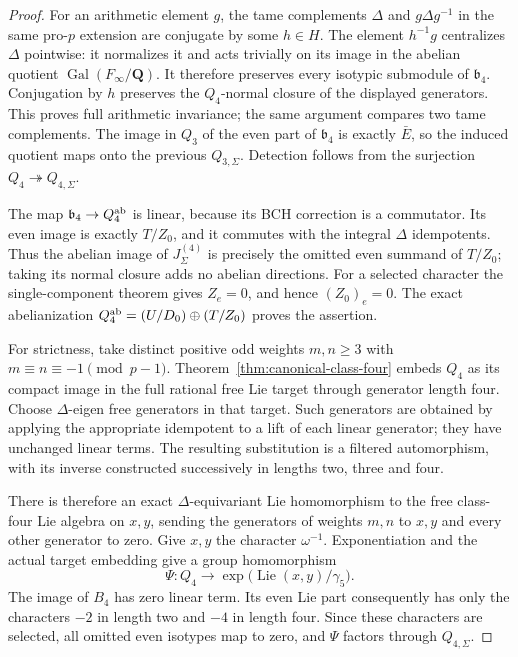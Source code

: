 \begin{proof}
For an arithmetic element $g$, the tame complements
$\Delta$ and $g\Delta g^{-1}$ in the same pro-$p$
extension are conjugate by some $h\in H$.
The element $h^{-1}g$ centralizes $\Delta$ pointwise:
it normalizes it and acts trivially on its image in
the abelian quotient $\operatorname{Gal}(F_\infty/\mathbf Q)$.
It therefore preserves every isotypic submodule of
$\mathfrak b_4$. Conjugation by $h$ preserves the
$Q_4$-normal closure of the displayed generators.
This proves full arithmetic invariance; the same
argument compares two tame complements. The image
in $Q_3$ of the even part of $\mathfrak b_4$ is exactly
$\bar E$, so the induced quotient maps onto the
previous $Q_{3,\Sigma}$. Detection follows from the
surjection $Q_4\twoheadrightarrow Q_{4,\Sigma}$.

The map $\mathfrak b_4\to Q_4^{\rm ab}$ is linear,
because its BCH correction is a commutator.
Its even image is exactly $T/Z_0$, and it commutes
with the integral $\Delta$ idempotents. Thus the
abelian image of $J_\Sigma^{(4)}$ is precisely the
omitted even summand of $T/Z_0$; taking its normal
closure adds no abelian directions. For a selected
character the single-component theorem gives $Z_e=0$,
and hence $(Z_0)_e=0$. The exact abelianization
$Q_4^{\rm ab}=(U/D_0)\oplus(T/Z_0)$ proves the assertion.

For strictness, take distinct positive odd weights
$m,n\geq3$ with $m\equiv n\equiv-1\pmod{p-1}$.
Theorem~\ref{thm:canonical-class-four} embeds $Q_4$
as its compact image in the full rational free Lie
target through generator length four. Choose
$\Delta$-eigen free generators in that target. Such
generators are obtained by applying the appropriate
idempotent to a lift of each linear generator; they
have unchanged linear terms. The resulting substitution
is a filtered automorphism, with its inverse constructed
successively in lengths two, three and four.

There is therefore an exact $\Delta$-equivariant Lie
homomorphism to the free class-four Lie algebra on
$x,y$, sending the generators of weights $m,n$ to
$x,y$ and every other generator to zero. Give $x,y$
the character $\omega^{-1}$. Exponentiation and the
actual target embedding give a group homomorphism
\[
       \Psi:Q_4\longrightarrow
           \exp\bigl(\operatorname{Lie}(x,y)/\gamma_5\bigr).
\]
The image of $B_4$ has zero linear term. Its even
Lie part consequently has only the characters $-2$
in length two and $-4$ in length four. Since these
characters are selected, all omitted even isotypes
map to zero, and $\Psi$ factors through $Q_{4,\Sigma}$.


\end{proof}
